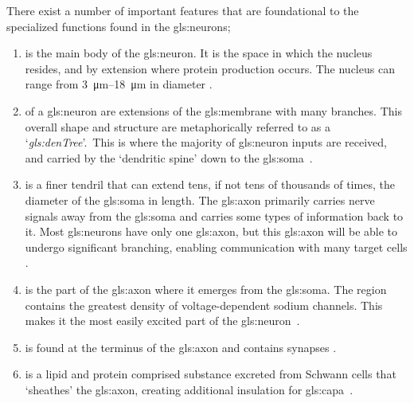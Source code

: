 \documentclass[class={myRUCProject}, crop=false]{standalone}
\begin{document}
There exist a number of important features that are foundational to the specialized functions found in the \glspl{gls:neuron};

\begin{enumerate}
    \item {} is the main body of the \gls{gls:neuron}. It is the space in which the nucleus resides, and by extension where protein production occurs. The nucleus can range from \qtyrange{3}{18}{\um} in diameter \cite{Hammond2015ch3,Hammond2015ch4}.
    \item {} of a \gls{gls:neuron} are extensions of the \gls{gls:membrane} with many branches. This overall shape and structure are metaphorically referred to as a `\textit{\gls{gls:denTree}}'.\footnotemark~This is where the majority of \gls{gls:neuron} inputs are received, and carried by the `dendritic spine' down to the \gls{gls:soma}~\cite{Hammond2015ch3,Hammond2015ch4}. 
    \item {} is a finer tendril that can extend tens, if not tens of thousands of times, the diameter of the \gls{gls:soma} in length. The \gls{gls:axon} primarily carries nerve signals away from the \gls{gls:soma} and carries some types of information back to it. Most \glspl{gls:neuron} have only one \gls{gls:axon}, but this \gls{gls:axon} will be able to undergo significant branching, enabling communication with many target cells \cite{Hammond2015ch3,Hammond2015ch4}. 
    \item {} is the part of the \gls{gls:axon} where it emerges from the \gls{gls:soma}. The region contains the greatest density of voltage-dependent sodium channels. This makes it the most easily excited part of the \gls{gls:neuron}~\cite{Hammond2015ch3,Hammond2015ch4}. 
    \item {} is found at the terminus of the \gls{gls:axon} and contains synapses \cite{Hammond2015ch3,Hammond2015ch4}. 
    \item {} is a lipid and protein comprised substance excreted from Schwann cells\alextodo{} that `sheathes' the \gls{gls:axon}, creating additional insulation for \gls{gls:capa}~\cite{Hammond2015ch4}.
\end{enumerate}
\end{document}
